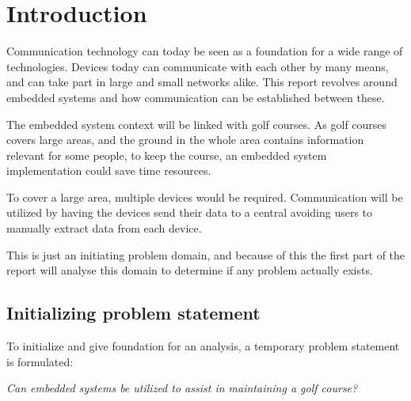 \chapter{Introduction} 
Communication technology can today be seen as a foundation for a wide range of technologies. Devices today can communicate with each other by many means, and can take part in large and small networks alike. This report revolves around embedded systems and how communication can be established between these.

The embedded system context will be linked with golf courses. As golf courses covers large areas, and the ground in the whole area contains information relevant for some people, to keep the course, an embedded system implementation could save time resources. 

To cover a large area, multiple devices would be required. Communication will be utilized by having the devices send their data to a central avoiding users to manually extract data from each device.

This is just an initiating problem domain, and because of this the first part of the report will analyse this domain to determine if any problem actually exists.


\section*{Initializing problem statement}
To initialize and give foundation for an analysis, a temporary problem statement is formulated:

\textit{Can embedded systems be utilized to assist in maintaining a golf course?}


